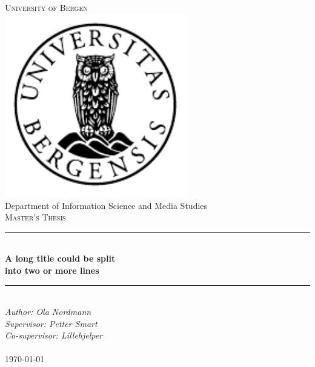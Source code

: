 \documentclass[../Main/thesis.tex]{subfiles}
\begin{document}
\newcommand{\HRule}{\rule{\linewidth}{0.5mm}}

\begin{titlepage}
\begin{center}
\textsc{\Huge University of Bergen}\\[0.4cm]
\includegraphics[width=8cm]{../Figures/uib} \\[0.5cm]

\large Department of Information Science and Media Studies\\[0.7cm]
\textsc{\huge Master's Thesis}\\[0.4cm]
\HRule \\[0.4cm]
{ \huge \bfseries A long title could be split \\into two or more lines}\\[0.5cm]
\HRule \\[1.0cm]

\emph{Author: Ola Nordmann}\\
\emph{Supervisor: Petter Smart}\\
\emph{Co-supervisor: Lillehjelper}\\

\paragraph*{}
\end{center}
\vfill
\begin{center}
{\large \today}
\end{center}
\end{titlepage}
\end{document}
